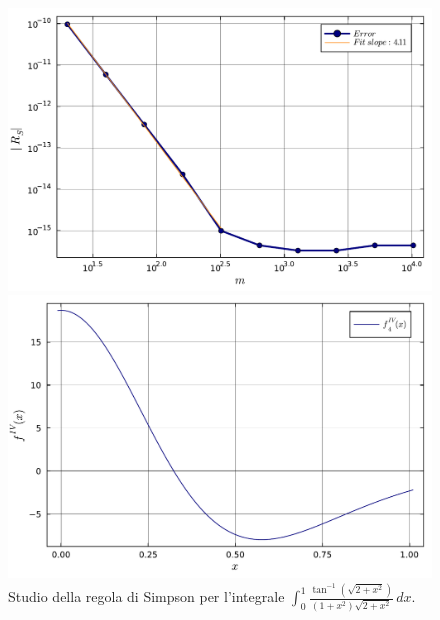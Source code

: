 \documentclass[letterpaper, 12pt]{article}
\begin{document}
\begin{figure}[!ht]
    \centering
    \begin{minipage}[b]{0.47\textwidth}
        \includegraphics[width=\textwidth]{5144.pdf}
    \end{minipage}
    \hspace{0.5cm}
    \begin{minipage}[b]{0.47\textwidth}
        \includegraphics[width=\textwidth]{5144_2.pdf}
    \end{minipage}
    \caption{Studio della regola di Simpson per l'integrale $\int_0^1 \frac{\tan^{-1}(\sqrt{2+x^2})}{(1+x^2)\sqrt{2+x^2}}\,dx$.}
    \label{fig:es5_1_4_4}
\end{figure}
\end{document}
